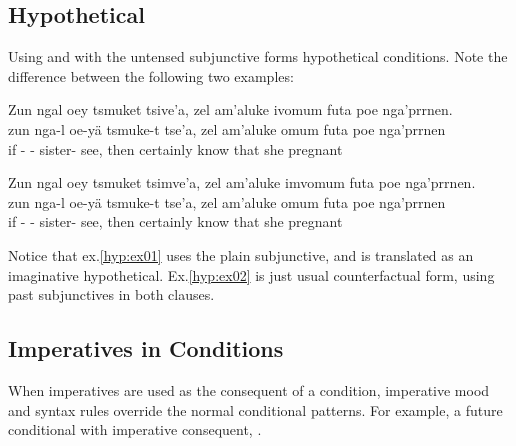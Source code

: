 \subsection{Hypothetical} 
Using   and   with the untensed
subjunctive forms hypothetical conditions.  Note the difference
between the following two examples:

\begin{interlin}\label{hyp:ex01}\small
\glll Zun ngal oey tsmuket tsive'a, zel am'aluke ivomum futa poe nga'prrnen.\\
    zun nga-l oe-yä tsmuke-t tse'a, zel am'aluke omum futa poe nga'prrnen \\
    if - - sister- see, then certainly know that she pregnant\\
 \Ipawl{}
\end{interlin}

\begin{interlin}\label{hyp:ex02}\small
\glll Zun ngal oey tsmuket tsimve'a, zel am'aluke imvomum futa poe nga'prrnen.\\
    zun nga-l oe-yä tsmuke-t tse'a, zel am'aluke omum futa poe nga'prrnen \\
    if - - sister- see, then certainly know that she pregnant\\
 \Ipawl{}
\end{interlin}

\noindent Notice that ex.\ref{hyp:ex01} uses the plain subjunctive,
and is translated as an imaginative hypothetical.  Ex.\ref{hyp:ex02}
is just usual counterfactual form, using past subjunctives in both
clauses.

\subsection{Imperatives in Conditions} When imperatives are used as
the consequent of a condition, imperative mood and syntax rules
override the normal conditional patterns.  For example, a future
conditional with imperative consequent,  .  


